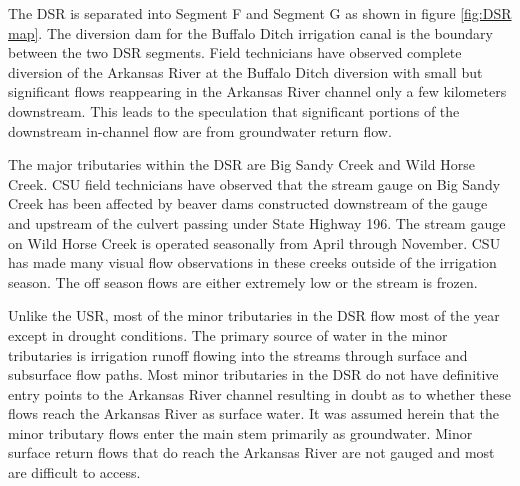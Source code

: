 
The DSR is separated into Segment F and Segment G as shown in figure \ref{fig:DSR map}. The diversion dam for the Buffalo Ditch irrigation canal is the boundary between the two DSR segments.  Field technicians have observed complete diversion of the Arkansas River at the Buffalo Ditch diversion with small but significant flows reappearing in the Arkansas River channel only a few kilometers downstream.  This leads to the speculation that significant portions of the downstream in-channel flow are from groundwater return flow.

The major tributaries within the DSR are Big Sandy Creek and Wild Horse Creek.  CSU field technicians have observed that the stream gauge on Big Sandy Creek has been affected by beaver dams constructed downstream of the gauge and upstream of the culvert passing under State Highway 196.  The stream gauge on Wild Horse Creek is operated seasonally from April through November.  CSU has made many visual flow observations in these creeks outside of the irrigation season.  The off season flows are either extremely low or the stream is frozen.

Unlike the USR, most of the minor tributaries in the DSR flow most of the year except in drought conditions.  The primary source of water in the minor tributaries is irrigation runoff flowing into the streams through surface and subsurface flow paths.  Most minor tributaries in the DSR do not have definitive entry points to the Arkansas River channel resulting in doubt as to whether these flows reach the Arkansas River as surface water.  It was assumed herein that the minor tributary flows enter the main stem primarily as groundwater.  Minor surface return flows that do reach the Arkansas River are not gauged and most are difficult to access. 


